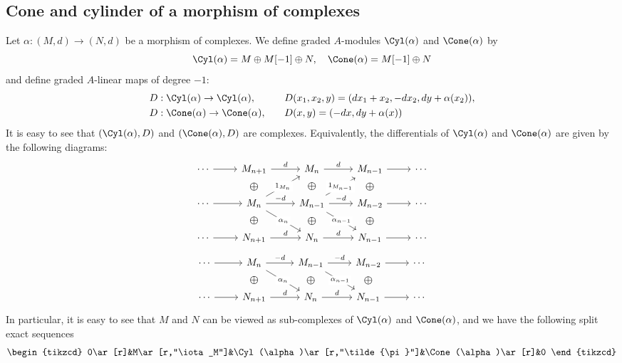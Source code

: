 \subsection{Cone and cylinder of a morphism of complexes}
Let $\alpha:(M,d)\to(N,d)$ be a morphism of complexes. We define graded $A$-modules $\Cyl(\alpha)$ and $\Cone(\alpha)$ by
\[\Cyl(\alpha)=M\oplus M[-1]\oplus N,\quad \Cone(\alpha)=M[-1]\oplus N\]
and define graded $A$-linear maps of degree $-1$:
\begin{alignat*}{2}
&D:\Cyl(\alpha)\to\Cyl(\alpha),&\quad& D(x_1,x_2,y)=(dx_1+x_2,-dx_2,dy+\alpha(x_2)),\\
&D:\Cone(\alpha)\to\Cone(\alpha),&\quad& D(x,y)=(-dx,dy+\alpha(x))
\end{alignat*}
It is easy to see that $(\Cyl(\alpha),D)$ and $(\Cone(\alpha),D)$ are complexes. Equivalently, the differentials of $\Cyl(\alpha)$ and $\Cone(\alpha)$ are given by the following diagrams:
\[\begin{tikzcd}
\cdots\ar[r]&M_{n+1}\ar[draw=none]{d}[name=X, anchor=center,scale=1.5]{\oplus}\ar[r,"d"]&M_n\ar[draw=none]{d}[name=X, anchor=center,scale=1.5]{\oplus}\ar[r,"d"]&M_{n-1}\ar[draw=none]{d}[name=X, anchor=center,scale=1.5]{\oplus}\ar[r]&\cdots\\
\cdots\ar[r]&M_{n}\ar[draw=none]{d}[name=X, anchor=center,scale=1.5]{\oplus}\ar[ru,"1_{M_n}"description]\ar[r,"-d"]\ar[rd,swap,"\alpha_n"description]&M_{n-1}\ar[draw=none]{d}[name=X, anchor=center,scale=1.5]{\oplus}\ar[ru,"1_{M_{n-1}}"description]\ar[rd,swap,"\alpha_{n-1}"description]\ar[r,"-d"]&M_{n-2}\ar[draw=none]{d}[name=X, anchor=center,scale=1.5]{\oplus}\ar[r]&\cdots\\
\cdots\ar[r]&N_{n+1}\ar[r,"d"]&N_n\ar[r,"d"]&N_{n-1}\ar[r]&\cdots
\end{tikzcd}\]
\[\begin{tikzcd}
\cdots\ar[r]&M_{n}\ar[draw=none]{d}[name=X, anchor=center,scale=1.5]{\oplus}\ar[r,"-d"]\ar[rd,swap,"\alpha_n"description]&M_{n-1}\ar[draw=none]{d}[name=X, anchor=center,scale=1.5]{\oplus}\ar[rd,swap,"\alpha_{n-1}"description]\ar[r,"-d"]&M_{n-2}\ar[draw=none]{d}[name=X, anchor=center,scale=1.5]{\oplus}\ar[r]&\cdots\\
\cdots\ar[r]&N_{n+1}\ar[r,"d"]&N_n\ar[r,"d"]&N_{n-1}\ar[r]&\cdots
\end{tikzcd}\]
In particular, it is easy to see that $M$ and $N$ can be viewed as sub-complexes of $\Cyl(\alpha)$ and $\Cone(\alpha)$, and we have the following split exact sequences
\begin{equation}\label{module complex exact seq of Cyl}
\begin{tikzcd}
0\ar[r]&M\ar[r,"\iota_M"]&\Cyl(\alpha)\ar[r,"\tilde{\pi}"]&\Cone(\alpha)\ar[r]&0
\end{tikzcd}
\end{equation}
